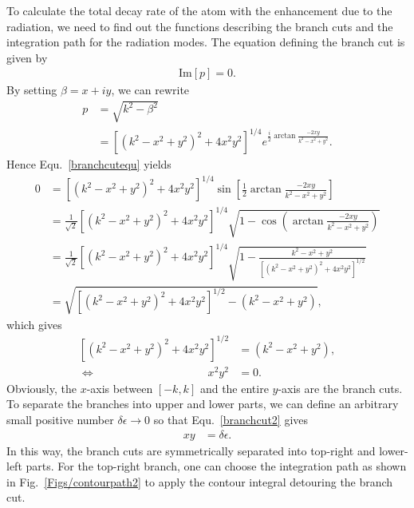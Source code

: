 \documentclass[]{report}
\begin{document}
To calculate the total decay rate of the atom with the enhancement due to the radiation, we need to find out the functions describing the branch cuts and the integration path for the radiation modes. The equation defining the branch cut is given by
\begin{align}\label{branchcutequ}
\mathrm{Im}\left[p \right]=0.
\end{align}
By setting $ \beta=x+iy $, we can rewrite 
\begin{align}
p&=\sqrt{k^2-\beta^2}\\
&=\left[(k^2-x^2+y^2)^2 + 4x^2y^2 \right]^{1/4}e^{\frac{i}{2}\arctan\frac{-2xy}{k^2-x^2+y^2}}.
\end{align}
Hence Equ.~\ref{branchcutequ} yields
\begin{align}
0&= \left[(k^2-x^2+y^2)^2 + 4x^2y^2 \right]^{1/4} \sin \left[\frac{1}{2}\arctan\frac{-2xy}{k^2-x^2+y^2} \right]\\
&= \frac{1}{\sqrt{2}} \left[(k^2\!-\! x^2\!+\! y^2)^2 \!+\! 4x^2y^2 \right]^{1/4} \sqrt{1\!-\!\cos \left(\arctan\frac{-2xy}{k^2\!-\! x^2\!+\! y^2} \right)}\\
&= \frac{1}{\sqrt{2}} \left[(k^2\!-\!x^2\!+\! y^2)^2 \!+\! 4x^2y^2 \right]^{1/4} \sqrt{1\!-\! \frac{k^2\!-\! x^2\!+\! y^2}{\left[(k^2\!-\! x^2\!+\! y^2)^2 \!+\! 4x^2y^2 \right]^{1/2}} }\\
&=\sqrt{\left[(k^2-x^2+y^2)^2 + 4x^2y^2 \right]^{1/2}-(k^2-x^2+y^2)},
\end{align}
which gives
\begin{align}
\left[(k^2-x^2+y^2)^2 + 4x^2y^2 \right]^{1/2}&=(k^2-x^2+y^2),\\
\Leftrightarrow \qquad \qquad \qquad \qquad \qquad x^2y^2&=0.\label{branchcut2}
\end{align}
Obviously, the $ x $-axis between $ [-k,k] $ and the entire $ y $-axis are the branch cuts. To separate the branches into upper and lower parts, we can define an arbitrary small positive number $ \delta\epsilon\rightarrow 0 $ so that Equ.~\ref{branchcut2} gives
\begin{align}
xy&=\delta\epsilon.
\end{align}
In this way, the branch cuts are symmetrically separated into top-right and lower-left parts. For the top-right branch, one can choose the integration path as shown in Fig.~\ref{Figs/contourpath2} to apply the contour integral detouring the branch cut. 

\end{document}
